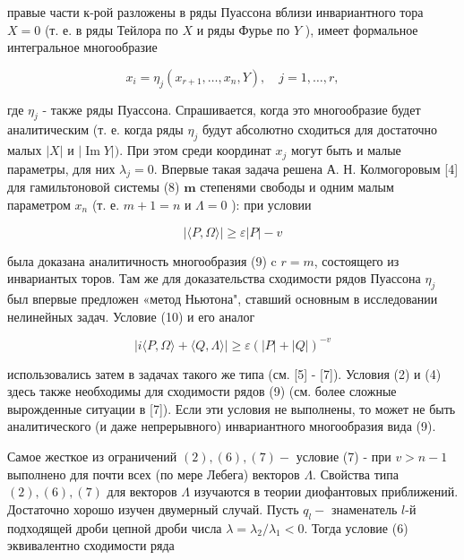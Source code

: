\documentclass[10pt]{article}
\begin{document}
правые части к-рой разложены в ряды Пуассона вблизи инвариантного тора $X=0$ (т. е. в ряды Тейлора по $X$ и ряды Фурье по $Y$ ), имеет формальное интегральное многообразие



\[

x_{i}=\eta_{j}\left(x_{r+1}, \ldots, x_{n}, Y\right), \quad j=1, \ldots, r,

\]



где $\eta_{j}$ - также ряды Пуассона. Спрашивается, когда это многообразие будет аналитическим (т. е. когда ряды $\eta_{j}$ будут абсолютно сходиться для достаточно малых $|X|$ и $|\operatorname{Im} Y|)$. При этом среди координат $x_{j}$ могут быть и малые параметры, для них $\lambda_{j}=0$. Впервые такая задача решена А. Н. Колмогоровым [4] для гамильтоновой системы (8) $\mathbf{m}$ степенями свободы и одним малым параметром $x_{n}$ (т. е. $m+1=n$ и $\Lambda=0$ ): при условии



\[

|\langle P, \Omega\rangle| \geqslant \varepsilon|P|-v

\]



была доказана аналитичность многообразия (9) c $r=m$, состоящего из инвариантых торов. Там же для доказательства сходимости рядов Пуассона $\eta_{j}$ был впервые предложен «метод Ньютона", ставший основным в исследовании нелинейных задач. Условие (10) и его аналог



\[

|i\langle P, \Omega\rangle+\langle Q, \Lambda\rangle| \geqslant \varepsilon(|P|+|Q|)^{-v}

\]



использовались затем в задачах такого же типа (см. [5] - [7]). Условия (2) и (4) здесь также необходимы для сходимости рядов (9) (см. более сложные вырожденные ситуации в [7]). Если эти условия не выполнены, то может не быть аналитического (и даже непрерывного) инвариантного многообразия вида (9).



Самое жесткое из ограничений $(2),(6),(7)-$ условие (7) - при $v>n-1$ выполнено для почти всех (по мере Лебега) векторов $\Lambda$. Свойства типа $(2),(6),(7)$ для векторов $\Lambda$ изучаются в теории диофантовых приближений. Достаточно хорошо изучен двумерный случай. Пусть $q_{l}-$ знаменатель $l$-й подходящей дроби цепной дроби числа $\lambda=\lambda_{2} / \lambda_{1}<0$. Тогда условие (6) эквивалентно сходимости ряда
\end{document}
